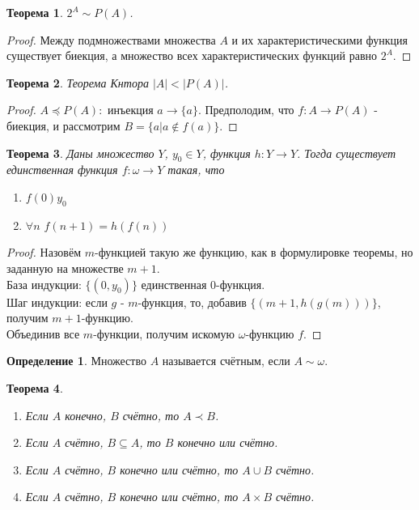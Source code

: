 \documentclass[a4paper, 12pt]{article}
\theoremstyle{definition}
\newtheorem*{definition}{Определение}
\theoremstyle{plain}
\newtheorem*{theorem}{Теорема}
\theoremstyle{remark}
\begin{document}
  \begin{theorem}
    $2^A\sim P(A)$.
  \end{theorem}
  \begin{proof}
    Между подмножествами множества $A$ и их характеристическими функция существует биекция, а множество всех характеристических функций равно $2^A$.
  \end{proof}
  \begin{theorem}{Теорема Кнтора}
    $|A|<|P(A)|$.
  \end{theorem}
  \begin{proof}
    $A\preceq P(A):$ инъекция $a\to\{a\}$. Предполодим, что $f:A\to P(A)$ - биекция, и рассмотрим $B=\{a|a\notin f(a)\}$.
  \end{proof}
  \begin{theorem}
    Даны множество $Y$, $y_0\in Y$, функция $h:Y\to Y$. Тогда существует единственная функция $f:\omega\to Y$ такая, что
    \begin{enumerate}
      \item $f(0)y_0$
      \item $\forall n$ $f(n+1)=h(f(n))$
    \end{enumerate} 
  \end{theorem}
  \begin{proof}
    Назовём $m$-функцией такую же функцию, как в формулировке теоремы, но заданную на множестве $m+1$.\\
    База индукции: $\{(0, y_0)\}$ единственная 0-функция.\\
    Шаг индукции: если $g$ - $m$-функция, то, добавив $\{(m+1,h(g(m)))\}$, получим $m+1$-функцию.\\Объединив все $m$-функции, получим искомую $\omega$-функцию $f$.
  \end{proof}
  \begin{definition}
    Множество $A$ называется счётным, если $A\sim\omega$.
  \end{definition}
  \begin{theorem}
    \begin{enumerate}
      \item Если $A$ конечно, $B$ счётно, то $A\prec B$.
      \item Если $A$ счётно, $B\subseteq A$, то $B$ конечно или счётно.
      \item Если $A$ счётно, $B$ конечно или счётно, то $A\cup B$ счётно.
      \item Если $A$ счётно, $B$ конечно или счётно, то $A\times B$ счётно.
    \end{enumerate}
  \end{theorem}
\end{document}
